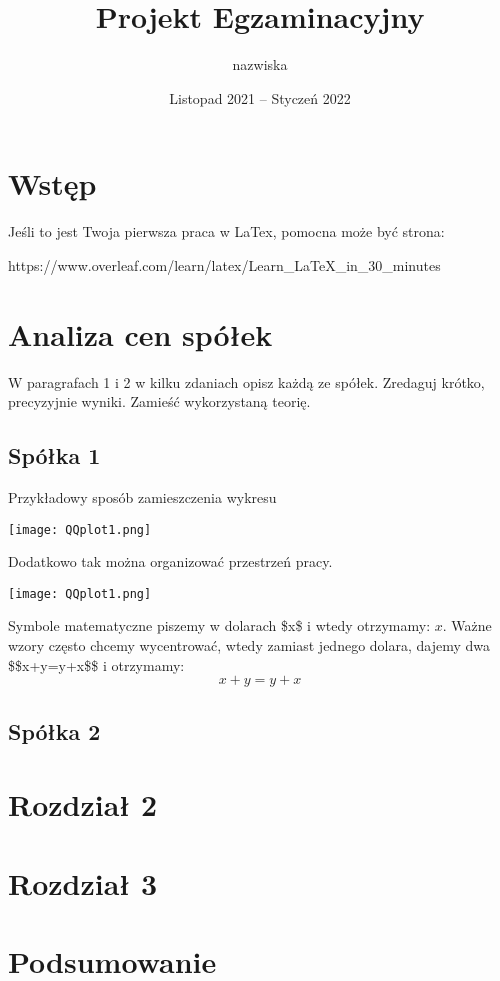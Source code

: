 \documentclass[a4paper,11pt]{article}
\title{Projekt Egzaminacyjny}
\author{nazwiska}
\date{Listopad 2021 -- Styczeń 2022}
\def\\{\hfill\break}
\begin{document}
\maketitle

\section{Wstęp}
Jeśli to jest Twoja pierwsza praca w LaTex, pomocna może być strona:
\smallskip

https://www.overleaf.com/learn/latex/Learn\_LaTeX\_in\_30\_minutes

\section {Analiza cen spółek}
W paragrafach 1 i 2 w kilku zdaniach opisz każdą ze spółek. Zredaguj krótko,
precyzyjnie wyniki. Zamieść wykorzystaną teorię.

\subsection{Spółka 1}
Przykładowy sposób zamieszczenia wykresu

\centerline{\texttt{[image: QQplot1.png]}}

\begin{minipage}[c]{6cm}
Dodatkowo tak można organizować przestrzeń pracy.
\end{minipage}\hfill
\begin{minipage}[c]{5cm}
\texttt{[image: QQplot1.png]}
\end{minipage}

\\Symbole matematyczne piszemy w dolarach \$x\$ i wtedy otrzymamy:   $x$.
Ważne wzory często chcemy wycentrować, wtedy zamiast jednego dolara, dajemy dwa
\$\$x+y=y+x\$\$ i otrzymamy:
$$x+y=y+x$$

\subsection{Spółka 2}


\section{Rozdział 2}
\section{Rozdział 3}
\section{Podsumowanie}
\end{document}
